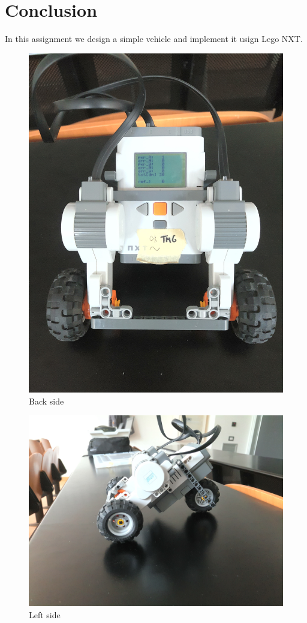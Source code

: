 \documentclass[a4paper,12pt,oneside]{article}
\begin{document}
\section{Conclusion}
In this assignment we design a simple vehicle and implement it usign Lego NXT.


\begin{figure}
	\centering
	\includegraphics[width=\columnwidth]{nxtImages/1.jpg}
	\caption{Back side}
	\label{fig:back}
\end{figure}
\begin{figure}
	\centering
	\includegraphics[width=\columnwidth]{nxtImages/2.jpg}
	\caption{Left side}
	\label{fig:left}
\end{figure}
\end{document}
